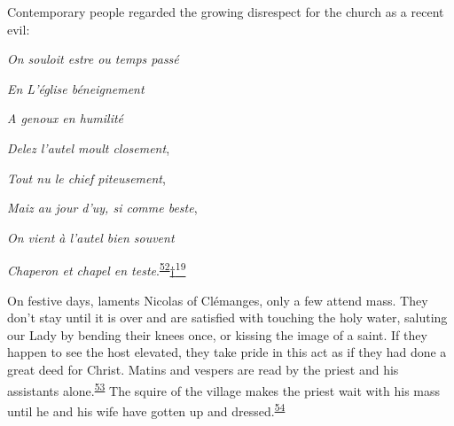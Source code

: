 Contemporary people regarded the growing disrespect for the church as a
recent evil:

\emph{On souloit estre ou temps passé}

\emph{En L'église béneignement}

\emph{A genoux en humilité}

\emph{Delez l'autel moult closement},

\emph{Tout nu le chief piteusement},

\emph{Maiz au jour d'uy, si comme beste},

\emph{On vient à l'autel bien souvent}

\emph{Chaperon et chapel en
teste}.\textsuperscript{\protect\hypertarget{13_Chapter_Six__THE_DEPICTION_OF_TH.xhtmlux5cux23id_1167}{\protect\hyperlink{23_NOTES.xhtmlux5cux23id_1168}{52}}}\protect\hypertarget{13_Chapter_Six__THE_DEPICTION_OF_TH.xhtmlux5cux23id_3025}{\protect\hyperlink{23_NOTES.xhtmlux5cux23id_3026}{†\textsuperscript{19}}}

On festive days, laments Nicolas of Clémanges, only a few attend mass.
They don't stay until it is over and are satisfied with touching the
holy water, saluting our Lady by bending their knees once, or kissing
the image of a saint. If they happen to see the host elevated, they take
pride in this act as if they had done a great deed for Christ. Matins
and vespers are read by the priest and his assistants
alone.\textsuperscript{\protect\hypertarget{13_Chapter_Six__THE_DEPICTION_OF_TH.xhtmlux5cux23id_1165}{\protect\hyperlink{23_NOTES.xhtmlux5cux23id_1166}{53}}}
The squire of the village makes the priest wait with his mass until he
and his wife have gotten up and
dressed.\textsuperscript{\protect\hypertarget{13_Chapter_Six__THE_DEPICTION_OF_TH.xhtmlux5cux23id_1163}{\protect\hyperlink{23_NOTES.xhtmlux5cux23id_1164}{54}}}

